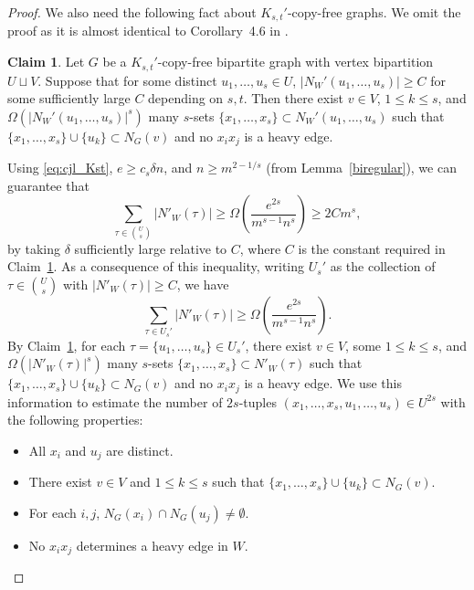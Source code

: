 \documentclass[11pt]{article}
\theoremstyle{definition}
\newtheorem{claim}[theorem]{Claim}
\begin{document}
\begin{proof}
    We also need the following fact about $K_{s,t}'$-copy-free graphs. We omit the proof as it is almost identical to Corollary~4.6 in \cite{conlon2021more}.
    \begin{claim}\label{cjl46}
        Let $G$ be a $K_{s,t}'$-copy-free bipartite graph with vertex bipartition $U \sqcup V$. Suppose that for some distinct $u_1,\dots,u_s\in U$, $|N_W'(u_1,\dots,u_s)| \geq C$ for some sufficiently large $C$ depending on $s,t$. Then there exist $v\in V$, $1\leq k\leq s$, and $\Omega(|N_W'(u_1,\dots,u_s)|^s)$ many $s$-sets $\{x_1,\dots,x_s\}\subset N_W'(u_1,\dots,u_s)$ such that $\{x_1,\dots,x_s\}\cup \{u_k\}\subset N_G(v)$ and no $x_ix_j$ is a heavy edge.
    \end{claim}

    Using \eqref{eq:cjl_Kst}, $e\geq c_s \delta n$, and $n\geq m^{2-1/s}$ (from Lemma~\ref{biregular}), we can guarantee that\begin{equation*}
        \sum_{\tau\in \binom{U}{s}}|N'_W(\tau)| \geq \Omega\left(\frac{e^{2s}}{m^{s-1}n^{s}}\right) \geq 2Cm^s,
    \end{equation*} by taking $\delta$ sufficiently large relative to $C$, where $C$ is the constant required in Claim~\ref{cjl46}. As a consequence of this inequality, writing $U_s'$ as the collection of $\tau \in \binom{U}{s}$ with $|N'_W(\tau)| \geq C$, we have\begin{equation*}
        \sum_{\tau\in U_s'} |N'_W(\tau)| \geq \Omega\left(\frac{e^{2s}}{m^{s-1}n^{s}}\right).
    \end{equation*} By Claim~\ref{cjl46}, for each $\tau = \{u_1, \dots, u_s\}\in U_s'$, there exist $v\in V$, some $1\leq k\leq s$, and $\Omega(|N'_W(\tau)|^s)$ many $s$-sets $\{x_1,\dots,x_s\}\subset N'_W(\tau)$ such that $\{x_1,\dots,x_s\}\cup \{u_k\}\subset N_G(v)$ and no $x_ix_j$ is a heavy edge. We use this information to estimate the number of $2s$-tuples $(x_1,\dots,x_s,u_1,\dots,u_s) \in U^{2s}$ with the following properties:\begin{itemize}
        \item[(i)] All $x_i$ and $u_j$ are distinct.
        \item[(ii)] There exist $v\in V$ and $1\leq k \leq s$ such that $\{x_1,\dots,x_s\}\cup\{u_k\}\subset N_G(v)$.
        \item[(iii)] For each $i,j$, $N_G(x_i)\cap N_G(u_j)\neq \emptyset$.
        \item[(iv)] No $x_ix_j$ determines a heavy edge in $W$.
    \end{itemize}

\end{proof}
\end{document}
